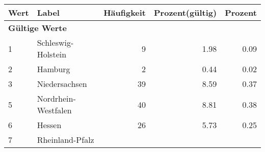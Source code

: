      \begin{longtable}{lXrrr}
     \toprule
     \textbf{Wert} & \textbf{Label} & \textbf{Häufigkeit} & \textbf{Prozent(gültig)} & \textbf{Prozent} \\
     \endhead
     \midrule
     \multicolumn{5}{l}{\textbf{Gültige Werte}}\\

     1 &
     \multicolumn{1}{X}{ Schleswig-Holstein   } &


       \num{9} &
       \num[round-mode=places,round-precision=2]{1.98} &
         \num[round-mode=places,round-precision=2]{0.09} \\

     2 &
     \multicolumn{1}{X}{ Hamburg   } &


       \num{2} &
       \num[round-mode=places,round-precision=2]{0.44} &
         \num[round-mode=places,round-precision=2]{0.02} \\

     3 &
     \multicolumn{1}{X}{ Niedersachsen   } &


       \num{39} &
       \num[round-mode=places,round-precision=2]{8.59} &
         \num[round-mode=places,round-precision=2]{0.37} \\

     5 &
     \multicolumn{1}{X}{ Nordrhein-Westfalen   } &


       \num{40} &
       \num[round-mode=places,round-precision=2]{8.81} &
         \num[round-mode=places,round-precision=2]{0.38} \\

     6 &
     \multicolumn{1}{X}{ Hessen   } &


       \num{26} &
       \num[round-mode=places,round-precision=2]{5.73} &
         \num[round-mode=places,round-precision=2]{0.25} \\

     7 &
     \multicolumn{1}{X}{ Rheinland-Pfalz   } &



\end{longtable}
